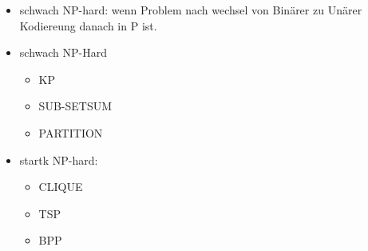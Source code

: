 \documentclass[a4paper, 10pt]{article}
\theoremstyle{definition}
\begin{document}
\begin{itemize}
    \item schwach NP-hard: wenn Problem nach wechsel von Binärer zu Unärer Kodiereung danach in P ist.
    \item schwach NP-Hard\begin{itemize}
        \item KP
        \item SUB-SETSUM
        \item PARTITION
    \end{itemize}
    \item startk NP-hard:\begin{itemize}
        \item CLIQUE
        \item TSP
        \item BPP
    \end{itemize}
\end{itemize}
\end{document}
